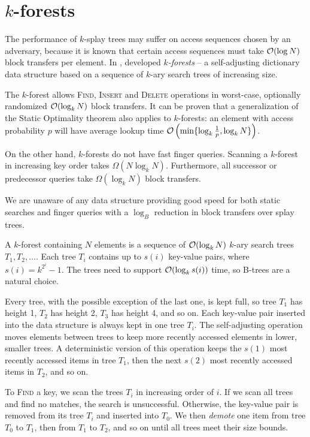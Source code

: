 \chapter{$k$-forests}
The performance of $k$-splay trees may suffer on access sequences chosen
by an adversary, because it is known that certain access sequences must
take $\mathcal{O}(\log N)$ block transfers per element.
In \citeyear{martel}, \citeauthor{martel} developed \textit{$k$-forests} --
a self-adjusting dictionary data structure based on a sequence of
$k$-ary search trees of increasing size.

The $k$-forest allows \textsc{Find}, \textsc{Insert} and \textsc{Delete}
operations in worst-case, optionally randomized $\mathcal{O}(\log_k N)$ block transfers.
It can be proven that a generalization of the Static Optimality theorem
also applies to $k$-forests: an element with access probability $p$
will have average lookup time $\mathcal{O}\left(\min\{\log_k \frac{1}{p}, \log_k
N\}\right)$.


On the other hand, $k$-forests do not have fast finger queries. Scanning
a $k$-forest in increasing key order takes $\Omega(N\log_k N)$. Furthermore,
all successor or predecessor queries take $\Omega(\log_k N)$ block transfers.

We are unaware of any data structure providing good speed for both static
searches and finger queries with a $\log_B$ reduction in block transfers
over splay trees.

A $k$-forest containing $N$ elements is a sequence of $\mathcal{O}(\log_k N)$ $k$-ary
search trees $T_1, T_2, \ldots$. Each tree $T_i$ contains up to $s(i)$ key-value
pairs, where $s(i) = k^{2^i} - 1$. The trees need to support $\mathcal{O}(\log_k s(i))$
time, so B-trees are a natural choice.

Every tree, with the possible exception of the last one, is kept full,
so tree $T_1$ has height 1, $T_2$ has height 2, $T_3$ has height 4, and so on.
Each key-value pair inserted into the data structure is always kept in one
tree $T_i$. The self-adjusting operation moves elements between trees to
keep more recently accessed elements in lower, smaller trees.
A deterministic version of this operation keeps the $s(1)$ most recently
accessed items in tree $T_1$, then the next $s(2)$ most recently accessed
items in $T_2$, and so on.

To \textsc{Find} a key, we scan the trees $T_i$ in increasing order of $i$.
If we scan all trees and find no matches, the search is unsuccessful.
Otherwise, the key-value pair is removed from its tree $T_i$ and inserted
into $T_0$. We then \textit{demote} one item from tree $T_0$ to $T_1$,
then from $T_1$ to $T_2$, and so on until all trees meet their size bounds.

